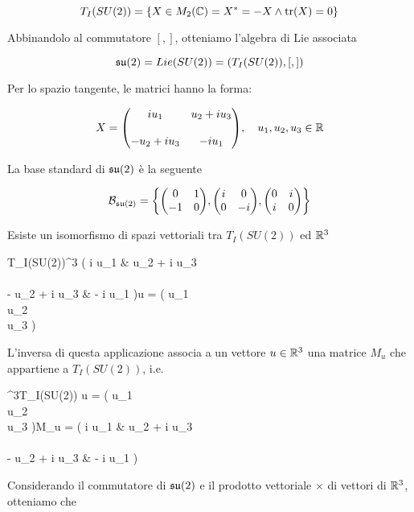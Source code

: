 \begin{equation}
	T_{I}(SU(2)) = \{X \in M_{2}(\mathbb{C}) = X^{*} = -X \wedge \tr(X) = 0 \}
\end{equation}

Abbinandolo al commutatore $ [,] $, otteniamo l'algebra di Lie associata

\begin{equation}
	\mathfrak{su}(2) = Lie(SU(2)) = (T_{I}(SU(2)),[,])
\end{equation}

Per lo spazio tangente, le matrici hanno la forma:

\begin{equation}
	X = \mqty( i u_{1} & u_{2} + i u_{3} \\\\ - u_{2} + i u_{3} & - i u_{1} ) \qcomma u_{1},u_{2},u_{3} \in \R
\end{equation}

La base standard di $ \mathfrak{su}(2) $ è la seguente

\begin{equation}
	\B_{\su(2)} = \left\{ %
		\mqty( 0 & 1 \\ -1 & 0 ), %
		\mqty( i & 0 \\ 0 & -i ), %
		\mqty( 0 & i \\ i & 0 ) %
		\right\}
\end{equation}

Esiste un isomorfismo di spazi vettoriali tra $ T_{I}(SU(2)) $ ed $ \mathbb{R}^{3} $

\map{\psi}%
	{T_{I}(SU(2))}{\R^{3}}%
	{\mqty( i u_{1} & u_{2} + i u_{3} \\\\ - u_{2} + i u_{3} & - i u_{1} )}{u = \mqty( u_{1} \\ u_{2} \\ u_{3} )}

L'inversa di questa applicazione associa a un vettore $ u \in \mathbb{R}^{3} $ una matrice $ M_{u} $ che appartiene a $ T_{I}(SU(2)) $, i.e.

%
	{\R^{3}}{T_{I}(SU(2))}%
	{u = \mqty( u_{1} \\ u_{2} \\ u_{3} )}{M_{u} = \mqty( i u_{1} & u_{2} + i u_{3} \\\\ - u_{2} + i u_{3} & - i u_{1} )}

Considerando il commutatore di $ \mathfrak{su}(2) $ e il prodotto vettoriale $ \times $ di vettori di $ \mathbb{R}^{3} $, otteniamo che

